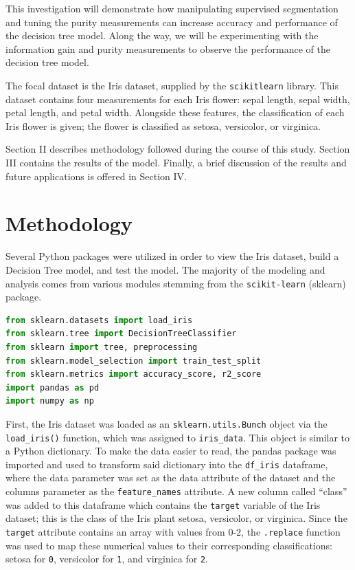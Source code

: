 \documentclass[journal]{IEEEtran}
\begin{document}
This investigation will demonstrate how manipulating supervised segmentation and tuning the purity measurements can increase accuracy and performance of the decision tree model. Along the way, we will be experimenting with the information gain and purity measurements to observe the performance of the decision tree model.

The focal dataset is the Iris dataset, supplied by the \lstinline{scikitlearn} library. This dataset contains four measurements for each Iris flower: sepal length, sepal width, petal length, and petal width. Alongside these features, the classification of each Iris flower is given; the flower is classified as setosa, versicolor,
or virginica. 


Section II describes methodology followed during the course of this study. Section III contains the results of the model. Finally, a brief discussion of the results and future applications is offered in Section IV.

\section{Methodology}
Several Python packages were utilized in order to view the Iris dataset, build a Decision Tree model, and test the model. The majority of the modeling and analysis comes from various modules stemming from the \lstinline{scikit-learn} (sklearn) package.

\begin{lstlisting}[language=Python, caption=Libraries used for this assignment.]
from sklearn.datasets import load_iris
from sklearn.tree import DecisionTreeClassifier
from sklearn import tree, preprocessing
from sklearn.model_selection import train_test_split
from sklearn.metrics import accuracy_score, r2_score
import pandas as pd 
import numpy as np
\end{lstlisting}

First, the Iris dataset was loaded as an \lstinline{sklearn.utils.Bunch} object via the \lstinline{load_iris()} function, which was assigned to \lstinline{iris_data}. This object is similar to a Python dictionary. To make the data easier to read, the pandas package was imported and used to transform said dictionary into the \lstinline{df_iris} dataframe, where the data parameter was set as the data attribute of the dataset and the columns parameter as the \lstinline{feature_names} attribute. A new column called “class” was added to this dataframe which contains the \lstinline{target} variable of the Iris dataset; this is the class of the Iris plant \textemdash setosa, versicolor, or virginica. Since the \lstinline{target} attribute contains an array with values from 0-2, the \lstinline{.replace} function was used to map these numerical values to their corresponding classifications: setosa for \lstinline{0}, versicolor for \lstinline{1}, and virginica for \lstinline{2}. 
\end{document}
